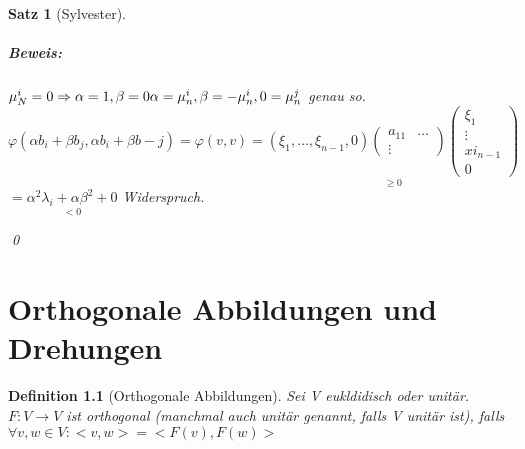\documentclass{report}
\newcommand{\lb}{\lambda}
\newcommand{\ve}[1]{{\begin{pmatrix}#1 \end{pmatrix}}}
\theoremstyle{customrem}
\theoremstyle{customdef}
\newtheorem{definition}{Definition}[chapter]
\newtheorem{satz}[definition]{Satz}
\renewenvironment{proof}{\paragraph{Beweis: }}{\qed}
\theoremstyle{customenv}
\begin{document}
\begin{satz}[Sylvester]
\begin{proof}
\begin{enumerate}
{        \(\mu_N^i = 0 \Rightarrow \alpha = 1, \beta = 0\\
        \alpha = \mu_n^i, \beta = -\mu_n^i, 0 = \mu_n^j\) genau so.
        \(\varphi(\alpha b_i + \beta b_j, \alpha b_i + \beta b-j) = \varphi(v, v) = \underset{\ge 0}{(\xi_1, \dots, \xi_{n-1}, 0)\ve{a_{11} & \dots\\\vdots} \ve{\xi_1 \\ \vdots \\ xi_{n-1} \\ 0}}\)
        \(= \underset{<0}{\alpha ^2 \lb_i + \alpha \beta^2 + 0}\)
        Widerspruch.
      }
    \end{enumerate}
  \end{proof}
\end{satz}

\chapter{Orthogonale Abbildungen und Drehungen}

\begin{definition}[Orthogonale Abbildungen]
  Sei V eukldidisch oder unit\"ar.
  \(F : V \to V\) ist orthogonal (manchmal auch unit\"ar genannt, falls V unit\"ar ist), falls
  \(\forall v, w \in V : <v, w> = <F(v), F(w)>\)
\end{definition}
\end{document}
